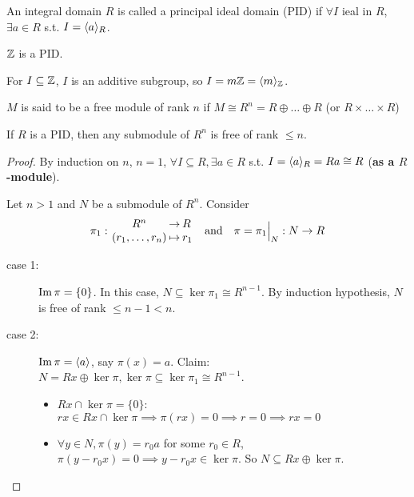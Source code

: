 \begin{definition}
  An integral domain $R$ is called a principal ideal domain (PID)
  if $\forall I$ ieal in $R$, $\exists a \in R$ s.t. $I = \langle a\rangle_R$.
\end{definition}

\begin{example}
  $\mathbb{Z}$ is a PID.

  For $I \subseteq \mathbb{Z}$, $I$ is an additive subgroup, so
  $I = m\mathbb{Z} = \langle m\rangle_{\mathbb{Z}}$.
\end{example}

\begin{definition}
  $M$ is said to be a free module of rank $n$ if
  $M \cong R^n = R \oplus \dots \oplus R$ (or $R \times \dots \times R$)
\end{definition}

\begin{theorem}
  If $R$ is a PID, then any submodule of $R^n$ is free of rank $\le n$.
  \begin{proof}
    By induction on $n$, $n = 1$, $\forall I \subseteq R, \exists a \in R$ s.t.
    $I = \langle a\rangle_R = Ra \cong R$ ({\bf as a $R$-module}).

    Let $n > 1$ and $N$ be a submodule of $R^n$.
    Consider
    \[\arraycolsep=1pt
      \pi_1:
      \begin{array}{ccl}
        R^n & \to & R \\
        (r_1, \dots, r_n) & \mapsto & r_1
      \end{array}
      \quad \text{and} \quad
      \pi = \pi_1\Big|_N: N \to R
    \]
    \begin{description}
      \item[case 1:] $\operatorname{Im} \pi = \{0\}$. In this case,
        $N \subseteq \ker\pi_1 \cong R^{n-1}$.
        By induction hypothesis, $N$ is free of rank $\le n-1 < n$.
      \item[case 2:] $\operatorname{Im} \pi = \langle a\rangle$, say $\pi(x) = a$.
        Claim: $N = Rx \oplus \ker\pi,
        \ker \pi \subseteq \ker \pi_1 \cong R^{n-1}$.
        \begin{itemize}
          \item $Rx \cap \ker\pi = \{0\}$:
            $rx \in Rx \cap \ker\pi \implies \pi(rx) = 0 \implies r = 0
            \implies rx = 0$
          \item $\forall y \in N, \pi(y) = r_0a $ for some $r_0 \in R$,
            $\pi(y - r_0x) = 0 \implies y - r_0x \in \ker\pi$.
            So $N \subseteq Rx \oplus \ker\pi$. \qedhere
        \end{itemize}
    \end{description}
  \end{proof}
\end{theorem}

